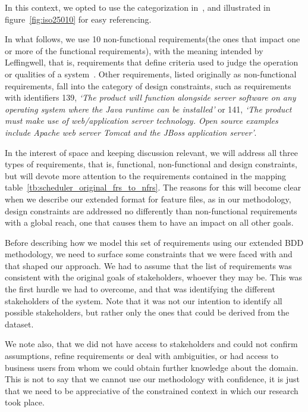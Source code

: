 \documentclass[dissertation,final]{softeng}
\newcommand{\nfrs}{non-functional requirements\xspace}
\begin{document}
In this context, we opted to use the categorization in~, and illustrated in figure~\ref{fig:iso25010} for easy referencing.

In what follows, we use 10 \nfrs (the ones that impact one or more of the functional requirements), with the meaning intended by Leffingwell, that is, requirements that define criteria used to judge the operation or qualities of a system~\citep{Leffingwell2011}. Other requirements, listed originally as non-functional requirements, fall into the category of design constraints, such as requirements with identifiers 139, \emph{`The product will function alongside server software on any operating system where the Java runtime can be installed'} or 141, \emph{`The product must make use of web/application server technology. Open source examples include Apache web server Tomcat and the JBoss application server'}. 

In the interest of space and keeping discussion relevant, we will address all three types of requirements, that is, functional, non-functional and design constraints, but will devote more attention to the requirements contained in the mapping table~\ref{tb:scheduler_original_frs_to_nfrs}. The reasons for this will become clear when we describe our extended format for feature files, as in our methodology, design constraints are addressed no differently than non-functional requirements with a global reach, one that causes them to have an impact on all other goals.

Before describing how we model this set of requirements using our extended BDD methodology, we need to surface some constraints that we were faced with and that shaped our approach. We had to assume that the list of requirements was consistent with the original goals of stakeholders, whoever they may be. This was the first hurdle we had to overcome, and that was identifying the different stakeholders of the system. Note that it was not our intention to identify all possible stakeholders, but rather only the ones that could be derived from the dataset.

We note also, that we did not have access to stakeholders and could not confirm assumptions, refine requirements or deal with ambiguities, or had access to business users from whom we could obtain further knowledge about the domain. This is not to say that we cannot use our methodology with confidence, it is just that we need to be appreciative of the constrained context in which our research took place.
\end{document}
